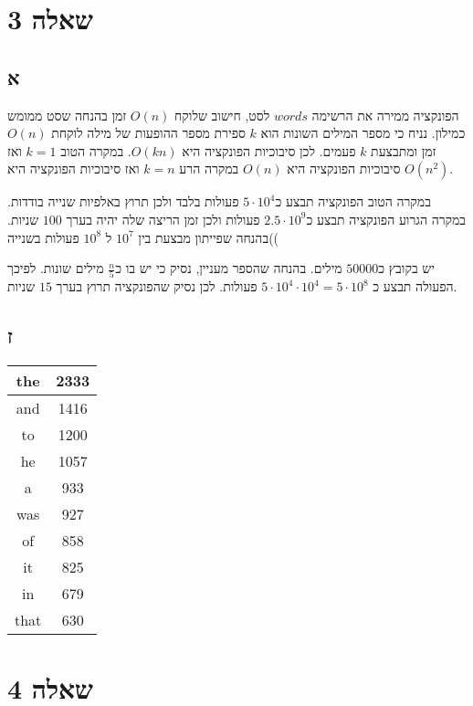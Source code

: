 \documentclass{article}
\begin{document}
\section*{שאלה 3}
\subsection*{א}

הפונקציה ממירה את הרשימה $words$ לסט, חישוב שלוקח $O(n)$ זמן בהנחה שסט ממומש כמילון. נניח כי מספר המילים השונות הוא $k$ ספירת מספר ההופעות של מילה לוקחת $O(n)$ זמן ומתבצעת $k$ פעמים. לכן סיבוכיות הפונקציה היא $O(kn)$. במקרה הטוב $k = 1$ ואז סיבוכיות הפונקציה היא $O(n)$ במקרה הרע $k = n$ ואז סיבוכיות הפונקציה היא $O(n^2)$.

במקרה הטוב הפונקציה תבצע כ$5 \cdot 10^4$ פעולות בלבד ולכן תרוץ באלפיות שנייה בודדות.
במקרה הגרוע הפונקציה תבצע כ$2.5 \cdot 10^9$ פעולות ולכן זמן הריצה שלה יהיה בערך $100$ שניות.
)בהנחה שפייתון מבצעת בין $10^7$ ל $10^8$ פעולות בשנייה(

יש בקובץ כ$50000$ מילים. בהנחה שהספר מעניין, נסיק כי יש בו כ$\frac{n}{5}$ מילים שונות. לפיכך הפעולה תבצע כ
$5 \cdot 10^4 \cdot 10^4 = 5 \cdot 10^8$ פעולות. לכן נסיק שהפונקציה תרוץ בערך $15$ שניות.
 
\subsection*{ז}

\begin{center}
\begin{tabular}{|c|c|}
\hline
the & 2333 \\
\hline
and & 1416 \\
\hline
to & 1200 \\
\hline
he & 1057 \\
\hline
a & 933 \\
\hline
was & 927 \\
\hline
of & 858 \\
\hline
it & 825 \\
\hline
in & 679 \\
\hline
that & 630 \\
\hline
\end{tabular}
\end{center}

\section*{שאלה 4}
\end{document}
